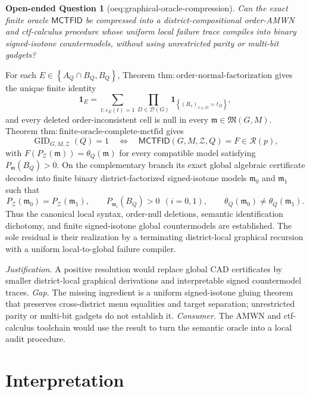 \documentclass{article}
\newtheorem{openendedquestion}{Open-ended Question}
\begin{document}
\begin{openendedquestion}[oeq:graphical-oracle-compression]\label{oeq:graphical-oracle-compression}
Can the exact finite oracle \(\mathsf{MCTFID}\) be compressed into a district-compositional order-AMWN and ctf-calculus procedure whose uniform local failure trace compiles into binary signed-isotone countermodels, without using unrestricted parity or multi-bit gadgets?
\end{openendedquestion}
For each \(E\in\left\{A_Q\cap B_Q,B_Q\right\}\), Theorem \(\mathrm{thm:order\text{-}normal\text{-}factorization}\) gives the unique finite identity
\[
 \mathbf 1_E
 =\sum_{t:e_E(t)=1}\prod_{D\in\mathcal D(G)}
   \mathbf 1_{\left\{(R_v)_{v\in D}=t_D\right\}},
\]
and every deleted order-inconsistent cell is null in every \(\mathfrak m\in\mathfrak M(G,M)\).  Theorem \(\mathrm{thm:finite\text{-}oracle\text{-}complete\text{-}mctfid}\) gives
\[
 \operatorname{GID}_{G,M,\mathcal Z}(Q)=1
 \quad\Longleftrightarrow\quad
 \mathsf{MCTFID}(G,M,\mathcal Z,Q)=F\in\mathcal R(p),
\]
with \(F(P_{\mathcal Z}(\mathfrak m))=\theta_Q(\mathfrak m)\) for every compatible model satisfying \(P_{\mathfrak m}(B_Q)>0\).  On the complementary branch its exact global algebraic certificate decodes into finite binary district-factorized signed-isotone models \(\mathfrak m_0\) and \(\mathfrak m_1\) such that
\[
 P_{\mathcal Z}(\mathfrak m_0)=P_{\mathcal Z}(\mathfrak m_1),\qquad
 P_{\mathfrak m_i}(B_Q)>0\ \ (i=0,1),\qquad
 \theta_Q(\mathfrak m_0)\ne\theta_Q(\mathfrak m_1).
\]
Thus the canonical local syntax, order-null deletions, semantic identification dichotomy, and finite signed-isotone global countermodels are established.  The sole residual is their realization by a terminating district-local graphical recursion with a uniform local-to-global failure compiler.
\par\smallskip\noindent \textit{Justification.} A positive resolution would replace global CAD certificates by smaller district-local graphical derivations and interpretable signed countermodel traces. \textit{Gap.} The missing ingredient is a uniform signed-isotone gluing theorem that preserves cross-district menu equalities and target separation; unrestricted parity or multi-bit gadgets do not establish it. \textit{Consumer.} The AMWN and ctf-calculus toolchain would use the result to turn the semantic oracle into a local audit procedure.

\section{Interpretation}
\end{document}

